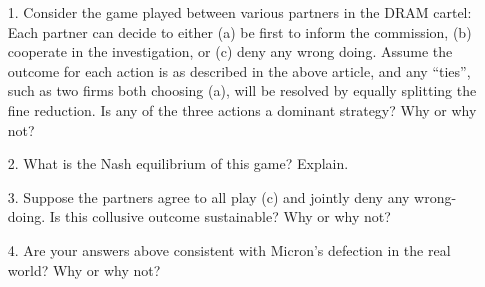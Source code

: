 \documentclass[12pt, xcolor=dvipsnames]{beamer}
\begin{document}
\begin{frame}
\small
\begin{enumerate}\itemsep-0.5ex 
\item[1.] Consider the game played between various partners in the DRAM cartel: Each partner can decide to either (a) be first to inform the commission, (b) cooperate in the investigation, or (c) deny any wrong doing. Assume the outcome for each action is as described in the above article, and any ``ties'', such as two firms both choosing (a), will be resolved by equally splitting the fine reduction. Is any of the three actions a dominant strategy? Why or why not?
\item[2.] What is the Nash equilibrium of this game? Explain.
\item[3.] Suppose the partners agree to all play (c) and jointly deny any wrong-doing. Is this collusive outcome sustainable? Why or why not?
\item[4.] Are your answers above consistent with Micron’s defection in the real world? Why or why not? 
\end{enumerate}
\end{frame}
\end{document}
